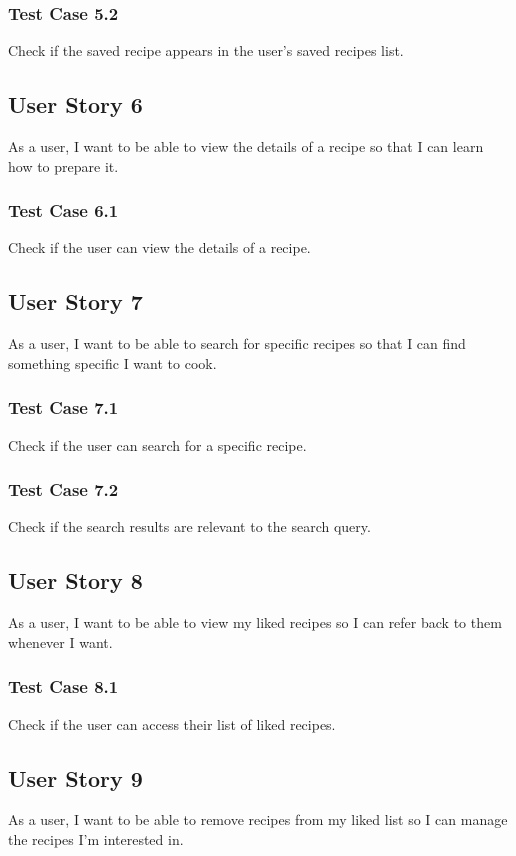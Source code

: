 \documentclass[11pt, letterpaper]{report}
\begin{document}
\subsubsection{Test Case 5.2}
Check if the saved recipe appears in the user's saved recipes list.

\subsection{User Story 6}
As a user, I want to be able to view the details of a recipe so that I can learn how to prepare it.

\subsubsection{Test Case 6.1}
Check if the user can view the details of a recipe.

\subsection{User Story 7}
As a user, I want to be able to search for specific recipes so that I can find something specific I want to cook.

\subsubsection{Test Case 7.1}
Check if the user can search for a specific recipe.

\subsubsection{Test Case 7.2}
Check if the search results are relevant to the search query.

\subsection{User Story 8}
As a user, I want to be able to view my liked recipes so I can refer back to them whenever I want.

\subsubsection{Test Case 8.1}
Check if the user can access their list of liked recipes.

\subsection{User Story 9}
As a user, I want to be able to remove recipes from my liked list so I can manage the recipes I'm interested in.
\end{document}
